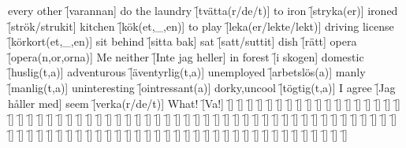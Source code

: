 \begin{questions}
\begin{multicols}{2}
        \question every other \f[varannan]
        \question do the laundry \f[tvätta(r/de/t)]
        \question to iron \f[stryka(er)]
        \question ironed \f[strök/strukit]
        \question kitchen \f[kök(et,\_,en)]
        \question to play \f[leka(er/lekte/lekt)]
        \question driving license \f[körkort(et,\_,en)]
        \question sit behind \f[sitta bak]
        \question sat \f[satt/suttit]
        \question dish \f[rätt]
        \question opera \f[opera(n,or,orna)]
        \question Me neither \f[Inte jag heller]
        \question in forest \f[i skogen]
        \question domestic \f[huslig(t,a)]
        \question adventurous \f[äventyrlig(t,a)]
        \question unemployed \f[arbetslös(a)]
        \question manly \f[manlig(t,a)]
        \question uninteresting \f[ointressant(a)]
        \question dorky,uncool \f[tögtig(t,a)]
        \question I agree \f[Jag håller med]
        \question seem \f[verka(r/de/t)]
        \question What! \f[Va!]
        \question  \f[]
        \question  \f[]
        \question  \f[]
        \question  \f[]
        \question  \f[]
        \question  \f[]
        \question  \f[]
        \question  \f[]
        \question  \f[]
        \question  \f[]
        \question  \f[]
        \question  \f[]
        \question  \f[]
        \question  \f[]
        \question  \f[]
        \question  \f[]
        \question  \f[]
        \question  \f[]
        \question  \f[]
        \question  \f[]
        \question  \f[]
        \question  \f[]
        \question  \f[]
        \question  \f[]
        \question  \f[]
        \question  \f[]
        \question  \f[]
        \question  \f[]
        \question  \f[]
        \question  \f[]
        \question  \f[]
        \question  \f[]
        \question  \f[]
        \question  \f[]
        \question  \f[]
        \question  \f[]
        \question  \f[]
        \question  \f[]
        \question  \f[]
        \question  \f[]
        \question  \f[]
        \question  \f[]
        \question  \f[]
        \question  \f[]
        \question  \f[]
        \question  \f[]
        \question  \f[]
        \question  \f[]
        \question  \f[]
        \question  \f[]
        \question  \f[]
        \question  \f[]
        \question  \f[]
        \question  \f[]
        \question  \f[]
        \question  \f[]
        \question  \f[]
        \question  \f[]
        \question  \f[]
        \question  \f[]
        \question  \f[]
        \question  \f[]
        \question  \f[]
        \question  \f[]
        \question  \f[]
        \question  \f[]
        \question  \f[]
        \question  \f[]
        \question  \f[]
        \question  \f[]
        \question  \f[]
        \question  \f[]
        \question  \f[]
        \question  \f[]
        \question  \f[]
        \question  \f[]
        \question  \f[]
        \question  \f[]
        \question  \f[]
        \question  \f[]
        \question  \f[]
        \question  \f[]
        \question  \f[]
        \question  \f[]
        \question  \f[]
        \question  \f[]
        \question  \f[]
        \question  \f[]
        \question  \f[]
        \question  \f[]
        \question  \f[]
        \question  \f[]
        \question  \f[]
    \end{multicols}
\end{questions}
